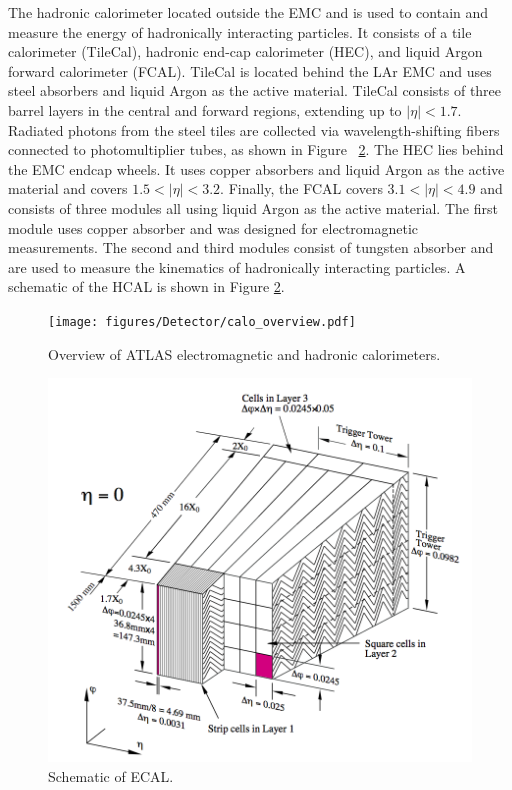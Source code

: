 The hadronic calorimeter located outside the EMC and is used to contain and measure the energy of hadronically interacting particles. It consists of a tile calorimeter (TileCal), hadronic end-cap calorimeter (HEC), and liquid Argon forward calorimeter (FCAL). TileCal is located behind the LAr EMC and uses steel absorbers and liquid Argon as the active material. TileCal consists of three barrel layers in the central and forward regions, extending up to $|\eta| < 1.7$. Radiated photons from the steel tiles are collected via wavelength-shifting fibers connected to photomultiplier tubes, as shown in Figure ~\ref{fig:hcal}. The HEC lies behind the EMC endcap wheels. It uses copper absorbers and liquid Argon as the active material and covers $1.5 < |\eta| < 3.2$. Finally, the FCAL covers $3.1 < |\eta| < 4.9$ and consists of three modules all using liquid Argon as the active material. The first module uses copper absorber and was designed for electromagnetic measurements. The second and third modules consist of tungsten absorber and are used to measure the kinematics of hadronically interacting particles. A schematic of the HCAL is shown in Figure \ref{fig:hcal}. 

\begin{figure}[h!]
  \centering
  \texttt{[image: figures/Detector/calo\_overview.pdf]}
  \caption{Overview of ATLAS electromagnetic and hadronic calorimeters.} 
  \label{fig:calo_overview}
\end{figure}
\FloatBarrier


\begin{figure}[h!]
  \centering
  \includegraphics[width=\hsize]{figures/Detector/ecal.pdf}
  \caption{Schematic of ECAL.} 
  \label{fig:hcal}
\end{figure}
\FloatBarrier




